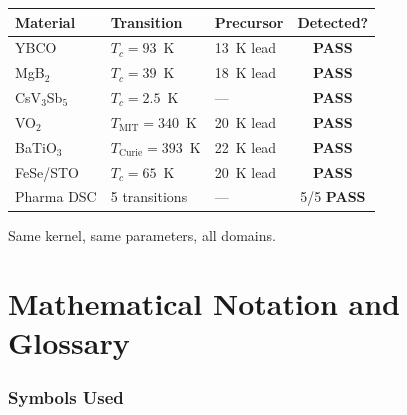 \documentclass[11pt, a4paper]{article}
\newcommand{\pass}{\textcolor{nm-green}{\textbf{PASS}}}
\begin{document}
\begin{center}
\begin{tabular}{@{}lllc@{}}
\toprule
\textbf{Material} & \textbf{Transition} & \textbf{Precursor} &
  \textbf{Detected?} \\
\midrule
YBCO & $T_c = 93$~K & 13~K lead & \pass \\
MgB$_2$ & $T_c = 39$~K & 18~K lead & \pass \\
CsV$_3$Sb$_5$ & $T_c = 2.5$~K & --- & \pass \\
VO$_2$ & $T_{\text{MIT}} = 340$~K & 20~K lead & \pass \\
BaTiO$_3$ & $T_{\text{Curie}} = 393$~K & 22~K lead & \pass \\
FeSe/STO & $T_c = 65$~K & 20~K lead & \pass \\
Pharma DSC & 5 transitions & --- & 5/5 \pass \\
\bottomrule
\end{tabular}
\end{center}

Same kernel, same parameters, all domains.

\newpage
\part{Mathematical Notation and Glossary}

\section{Symbols Used}
\end{document}
